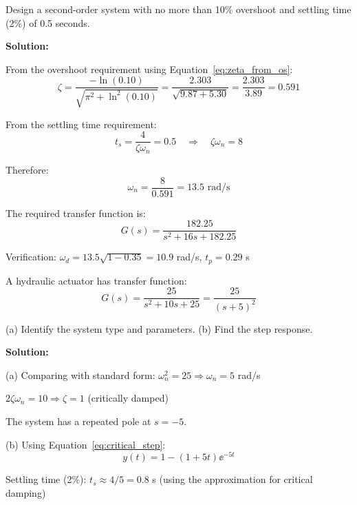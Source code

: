\begin{examplebox}[title=Example 7.3: Design for Specified Overshoot]
Design a second-order system with no more than 10\% overshoot and settling time (2\%) of 0.5 seconds.

\textbf{Solution:}

From the overshoot requirement using Equation~\eqref{eq:zeta_from_os}:
\begin{equation}
\zeta = \frac{-\ln(0.10)}{\sqrt{\pi^2 + \ln^2(0.10)}} = \frac{2.303}{\sqrt{9.87 + 5.30}} = \frac{2.303}{3.89} = 0.591
\end{equation}

From the settling time requirement:
\begin{equation}
t_s = \frac{4}{\zeta\omega_n} = 0.5 \quad \Rightarrow \quad \zeta\omega_n = 8
\end{equation}

Therefore:
\begin{equation}
\omega_n = \frac{8}{0.591} = 13.5 \text{ rad/s}
\end{equation}

The required transfer function is:
\begin{equation}
G(s) = \frac{182.25}{s^2 + 16s + 182.25}
\end{equation}

Verification: $\omega_d = 13.5\sqrt{1-0.35} = 10.9$ rad/s, $t_p = 0.29$ s
\end{examplebox}

\begin{examplebox}[title=Example 7.4: Overdamped System Response]
A hydraulic actuator has transfer function:
\begin{equation}
G(s) = \frac{25}{s^2 + 10s + 25} = \frac{25}{(s+5)^2}
\end{equation}

(a) Identify the system type and parameters. (b) Find the step response.

\textbf{Solution:}

(a) Comparing with standard form: $\omega_n^2 = 25 \Rightarrow \omega_n = 5$ rad/s

$2\zeta\omega_n = 10 \Rightarrow \zeta = 1$ (critically damped)

The system has a repeated pole at $s = -5$.

(b) Using Equation~\eqref{eq:critical_step}:
\begin{equation}
y(t) = 1 - (1 + 5t)\ee^{-5t}
\end{equation}

Settling time (2\%): $t_s \approx 4/5 = 0.8$ s (using the approximation for critical damping)
\end{examplebox}

